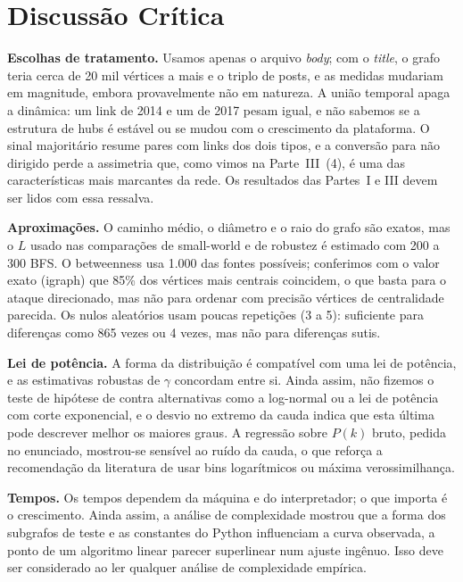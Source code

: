 \IfFileExists{webmedia.cls}{\webmediatrue\documentclass[sigconf]{webmedia}}{\documentclass[sigconf]{acmart}}
\begin{document}
\section{Discussão Crítica}
\textbf{Escolhas de tratamento.} Usamos apenas o arquivo \emph{body}; com o \emph{title}, o grafo teria
cerca de 20 mil vértices a mais e o triplo de posts, e as medidas mudariam em magnitude,
embora provavelmente não em natureza. A união temporal apaga a dinâmica: um link de 2014 e um de 2017
pesam igual, e não sabemos se a estrutura de hubs é estável ou se mudou com o crescimento da
plataforma. O sinal majoritário resume pares com links dos dois tipos, e a conversão para não dirigido
perde a assimetria que, como vimos na Parte~III~(4), é uma das características mais marcantes da rede.
Os resultados das Partes~I e III devem ser lidos com essa ressalva.

\textbf{Aproximações.} O caminho médio, o diâmetro e o raio do grafo são exatos, mas o $L$ usado nas
comparações de small-world e de robustez é estimado com 200 a 300 BFS. O betweenness usa 1.000 das
\nLCC{} fontes possíveis; conferimos com o valor exato (igraph) que 85\% dos vértices mais centrais
coincidem, o que basta para o ataque direcionado, mas não para ordenar com precisão vértices de
centralidade parecida. Os nulos aleatórios usam poucas repetições (3 a 5): suficiente para diferenças
como 865 vezes ou 4 vezes, mas não para diferenças sutis.

\textbf{Lei de potência.} A forma da distribuição é compatível com uma lei de potência, e as
estimativas robustas de $\gamma$ concordam entre si. Ainda assim, não fizemos o teste de hipótese de
\citet{clauset2009} contra alternativas como a log-normal ou a lei de potência com corte exponencial,
e o desvio no extremo da cauda indica que esta última pode descrever melhor os maiores graus. A
regressão sobre $P(k)$ bruto, pedida no enunciado, mostrou-se sensível ao ruído da cauda, o que reforça
a recomendação da literatura de usar bins logarítmicos ou máxima verossimilhança.

\textbf{Tempos.} Os tempos dependem da máquina e do interpretador; o que importa é o crescimento.
Ainda assim, a análise de complexidade mostrou que a forma dos subgrafos de teste e as constantes do
Python influenciam a curva observada, a ponto de um algoritmo linear parecer superlinear num ajuste
ingênuo. Isso deve ser considerado ao ler qualquer análise de complexidade empírica.
\end{document}
